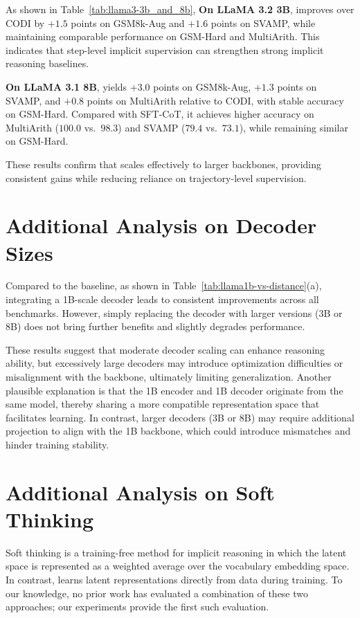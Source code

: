 As shown in Table~\ref{tab:llama3-3b_and_8b}, \textbf{On LLaMA 3.2 3B}, \methodname improves over CODI by $+1.5$ points on GSM8k-Aug and $+1.6$ points on SVAMP, while maintaining comparable performance on GSM-Hard and MultiArith.  
This indicates that step-level implicit supervision can strengthen strong implicit reasoning baselines.  

\textbf{On LLaMA 3.1 8B}, \methodname yields $+3.0$ points on GSM8k-Aug, $+1.3$ points on SVAMP, and $+0.8$ points on MultiArith relative to CODI, with stable accuracy on GSM-Hard.  
Compared with SFT-CoT, it achieves higher accuracy on MultiArith ($100.0$ vs.\ $98.3$) and SVAMP ($79.4$ vs.\ $73.1$), while remaining similar on GSM-Hard.  

These results confirm that \methodname scales effectively to larger backbones, providing consistent gains while reducing reliance on trajectory-level supervision.

\section{Additional Analysis on Decoder Sizes}
\label{appendix:decoder_size}

Compared to the baseline, as shown in Table~\ref{tab:llama1b-vs-distance}(a), integrating a 1B-scale decoder leads to consistent improvements across all benchmarks.  
However, simply replacing the decoder with larger versions (3B or 8B) does not bring further benefits and slightly degrades performance.


These results suggest that moderate decoder scaling can enhance reasoning ability, but excessively large decoders may introduce optimization difficulties or misalignment with the backbone, ultimately limiting generalization.  
Another plausible explanation is that the 1B encoder and 1B decoder originate from the same model, thereby sharing a more compatible representation space that facilitates learning.  
In contrast, larger decoders (3B or 8B) may require additional projection to align with the 1B backbone, which could introduce mismatches and hinder training stability.


\section{Additional Analysis on Soft Thinking}
\label{appendix:softthinking}

Soft thinking \citep{zhang2025soft, wu2025llms} is a training-free method for implicit reasoning in which the latent space is represented as a weighted average over the vocabulary embedding space.  
In contrast, \methodname learns latent representations directly from data during training.  
To our knowledge, no prior work has evaluated a combination of these two approaches; our experiments provide the first such evaluation.

